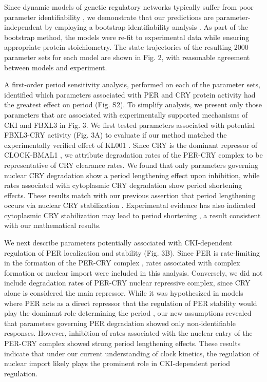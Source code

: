 Since dynamic models of genetic regulatory networks typically suffer from poor
parameter identifiability \cite{Gunawan2006}, we demonstrate that our
predictions are parameter-independent by employing a bootstrap identifiability
analysis \cite{St.John2013}. As part of the bootstrap method, the models were
re-fit to experimental data \cite{Lee2001} while ensuring appropriate protein
stoichiometry. The state
trajectories of the resulting 2000 parameter sets for each model are shown in
Fig. 2, with reasonable agreement between models and experiment.

A first-order period sensitivity analysis, performed on each of the parameter
sets, identified which parameters associated with PER and CRY protein activity
had the greatest effect on period (Fig. S2). To simplify analysis, we present
only those parameters that are associated with experimentally supported
mechanisms of CKI and FBXL3 in Fig. 3. We first tested parameters associated
with potential FBXL3-CRY activity (Fig. 3A) to evaluate if our method matched
the experimentally verified effect of KL001 \cite{Hirota2012}. Since CRY is the
dominant repressor of CLOCK-BMAL1 \cite{Ye2011}, we attribute degradation rates
of the PER-CRY complex to be representative of CRY clearance rates. We found
that only parameters governing nuclear CRY degradation show a period
lengthening effect upon inhibition, while rates associated with cytoplasmic CRY
degradation show period shortening effects. These results match with our
previous assertion that period lengthening occurs via nuclear CRY stabilization
\cite{Hirota2012}. Experimental evidence has also indicated cytoplasmic CRY
stabilization may lead to period shortening \cite{Kurabayashi2010}, a result
consistent with our mathematical results.

We next describe parameters potentially associated with CKI-dependent
regulation of PER localization and stability (Fig. 3B). Since PER is
rate-limiting in the formation of the PER-CRY complex \cite{Lee2001}, rates
associated with complex formation or nuclear import were included in this
analysis. Conversely, we did not include degradation rates of PER-CRY nuclear
repressive complex, since CRY alone is considered the main repressor. While it
was hypothesized in models where PER acts as a direct repressor that the
regulation of PER stability would play the dominant role determining the period
\cite{Gallego2006, Vanselow2006}, our new assumptions revealed that parameters
governing PER degradation showed only non-identifiable responses.  However,
inhibition of rates associated with the nuclear entry of the PER-CRY complex
showed strong period lengthening effects. These results indicate
that under our current understanding of clock kinetics, the regulation of
nuclear import likely plays the prominent role in CKI-dependent period
regulation.

